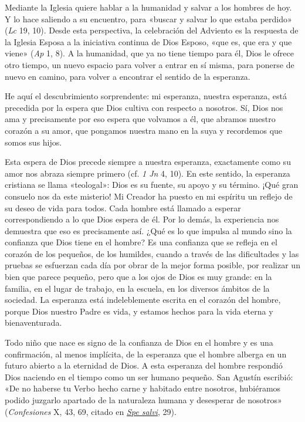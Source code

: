 Mediante la Iglesia quiere hablar a la humanidad y salvar a los hombres
de hoy. Y lo hace saliendo a su encuentro, para «buscar y salvar lo que
estaba perdido» (\emph{Lc} 19, 10). Desde esta perspectiva, la
celebración del Adviento es la respuesta de la Iglesia Esposa a la
iniciativa continua de Dios Esposo, «que es, que era y que viene»
(\emph{Ap} 1, 8). A la humanidad, que ya no tiene tiempo para él, Dios
le ofrece otro tiempo, un nuevo espacio para volver a entrar en sí
misma, para ponerse de nuevo en camino, para volver a encontrar el
sentido de la esperanza.

He aquí el descubrimiento sorprendente: mi esperanza, nuestra esperanza,
está precedida por la espera que Dios cultiva con respecto a nosotros.
Sí, Dios nos ama y precisamente por eso espera que volvamos a él, que
abramos nuestro corazón a su amor, que pongamos nuestra mano en la suya
y recordemos que somos sus hijos.

Esta espera de Dios precede siempre a nuestra esperanza, exactamente
como su amor nos abraza siempre primero (cf. \emph{1 Jn} 4, 10). En este
sentido, la esperanza cristiana se llama «teologal»: Dios es su fuente,
su apoyo y su término. ¡Qué gran consuelo nos da este misterio! Mi
Creador ha puesto en mi espíritu un reflejo de su deseo de vida para
todos. Cada hombre está llamado a esperar correspondiendo a lo que Dios
espera de él. Por lo demás, la experiencia nos demuestra que eso es
precisamente así. ¿Qué es lo que impulsa al mundo sino la confianza que
Dios tiene en el hombre? Es una confianza que se refleja en el corazón
de los pequeños, de los humildes, cuando a través de las dificultades y
las pruebas se esfuerzan cada día por obrar de la mejor forma posible,
por realizar un bien que parece pequeño, pero que a los ojos de Dios es
muy grande: en la familia, en el lugar de trabajo, en la escuela, en los
diversos ámbitos de la sociedad. La esperanza está indeleblemente
escrita en el corazón del hombre, porque Dios nuestro Padre es vida, y
estamos hechos para la vida eterna y bienaventurada.

Todo niño que nace es signo de la confianza de Dios en el hombre y es
una confirmación, al menos implícita, de la esperanza que el hombre
alberga en un futuro abierto a la eternidad de Dios. A esta esperanza
del hombre respondió Dios naciendo en el tiempo como un ser humano
pequeño. San Agustín escribió: «De no haberse tu Verbo hecho carne y
habitado entre nosotros, hubiéramos podido juzgarlo apartado de la
naturaleza humana y desesperar de nosotros» (\emph{Confesiones} X, 43,
69, citado en
\emph{\href{/content/benedict-xvi/es/encyclicals/documents/hf_ben-xvi_enc_20071130_spe-salvi.html}{Spe
		salvi}}, 29).

